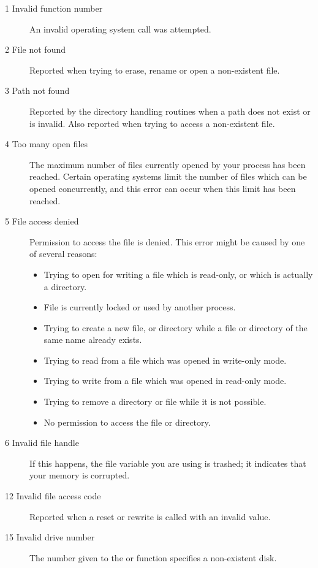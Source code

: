 \begin{description}
\item [1  Invalid function number]
An invalid operating system call was attempted.

\item [2  File not found]
Reported when trying to erase, rename or open a non-existent
file.

\item [3  Path not found]
Reported by the directory handling routines when a path does not
exist or is invalid. Also reported when trying to access a
non-existent file.

\item [4  Too many open files]
The maximum number of files currently opened by your process
has been reached. Certain operating systems limit the number
of files which can be opened concurrently, and this error
can occur when this limit has been reached.

\item [5  File access denied]
Permission to access the file is denied. This error might
be caused by one of several reasons:
\begin{itemize}
\item Trying to open for writing a file which is
read-only, or which is actually a directory.
\item File is currently locked or used by another process.
\item Trying to create a new file, or directory while a
file or directory of the same name already exists.
\item Trying to read from a file which was opened in write-only mode.
\item Trying to write from a file which was opened in read-only mode.
\item Trying to remove a directory or file while it is not possible.
\item No permission to access the file or directory.
\end{itemize}

\item [6  Invalid file handle]
If this happens, the file variable you are using is trashed; it
indicates that your memory is corrupted.

\item [12  Invalid file access code]
Reported when a reset or rewrite is called with an invalid 
value.

\item [15  Invalid drive number]
The number given to the  or  function specifies a
non-existent disk.


\end{description}
